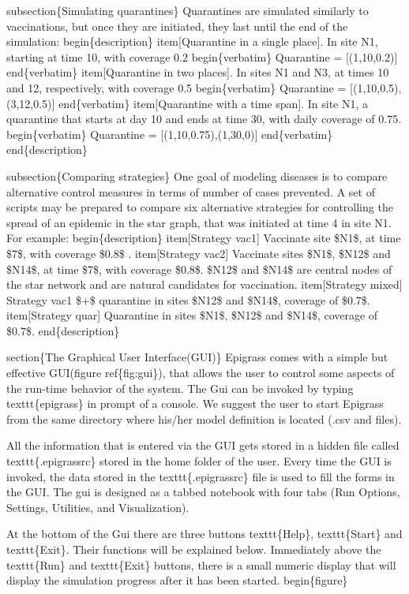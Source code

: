 \documentclass[a4paper,10pt]{manual}
\begin{document}
subsection\{Simulating quarantines\}
Quarantines are simulated similarly to vaccinations, but once they are initiated, they last until the end of the simulation:
begin\{description\}
item{[}Quarantine in a single place{]}.  In site N1, starting at time 10, with coverage 0.2
begin\{verbatim\}
Quarantine = {[}(1,10,0.2){]}
end\{verbatim\}
item{[}Quarantine in two places{]}.  In sites N1 and N3, at times 10 and 12, respectively, with coverage 0.5
begin\{verbatim\}
Quarantine = {[}(1,10,0.5),(3,12,0.5){]}
end\{verbatim\}
item{[}Quarantine with a time span{]}.  In site N1, a quarantine that starts at day 10 and ends at time 30, with daily coverage of 0.75.
begin\{verbatim\}
Quarantine = {[}(1,10,0.75),(1,30,0){]}
end\{verbatim\}
end\{description\}

subsection\{Comparing strategies\}
One goal of modeling diseases is to compare alternative control measures in terms of number of cases prevented. A set of scripts may be prepared to compare six alternative strategies for controlling the spread of an epidemic in the star graph, that was initiated at time 4 in site N1. For example:
begin\{description\}
item{[}Strategy vac1{]}  Vaccinate site \$N1\$, at time \$7\$, with coverage \$0.8\$ .
item{[}Strategy vac2{]}  Vaccinate sites \$N1\$, \$N12\$ and \$N14\$, at time \$7\$, with coverage \$0.8\$. \$N12\$ and \$N14\$ are central nodes of the star network and are natural candidates for vaccination.
item{[}Strategy mixed{]} Strategy vac1 \$+\$ quarantine in sites \$N12\$ and \$N14\$, coverage of \$0.7\$.
item{[}Strategy quar{]} Quarantine in sites \$N1\$, \$N12\$ and \$N14\$, coverage of \$0.7\$.
end\{description\}

section\{The Graphical User Interface(GUI)\}
Epigrass comes with a simple but effective GUI(figure ref\{fig:gui\}), that allows the user to control some aspects of the run-time behavior of the system. The Gui can be invoked by typing texttt\{epigrass\} in prompt of a console. We suggest the user to start Epigrass from the same directory where his/her model definition is located (.csv and    files).

All the information that is entered via the GUI gets  stored in a hidden file called texttt\{.epigrassrc\} stored in the home folder of the user. Every time the GUI is invoked, the data stored in the texttt\{.epigrassrc\} file is used to fill the forms in the GUI. The gui is designed as a tabbed notebook with four tabs (Run Options, Settings, Utilities, and Visualization).

At the bottom of the Gui there are three buttons texttt\{Help\}, texttt\{Start\} and texttt\{Exit\}. Their functions will be explained below. Immediately above the texttt\{Run\} and texttt\{Exit\} buttons, there is a small numeric display that will display the simulation progress after it has been started.
begin\{figure\}
\end{document}
